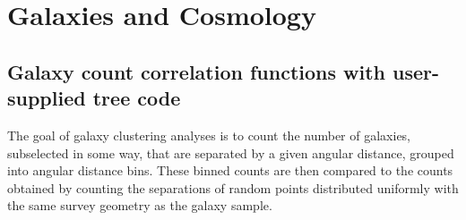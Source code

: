 \documentclass[DM,authoryear,toc]{lsstdoc}
\begin{document}

\section{Galaxies and Cosmology}

\subsection{Galaxy count correlation functions with user-supplied tree code}

The goal of galaxy clustering analyses is to count the number of galaxies,
subselected in some way, that are separated by a given angular distance,
grouped into angular distance bins. These binned counts are then compared to
the counts obtained by counting the separations of random points distributed
uniformly with the same survey geometry as the galaxy sample. 
\end{document}
